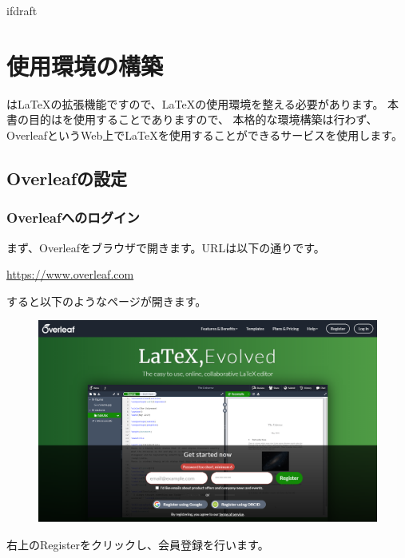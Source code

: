 \expandafter\ifx\csname ifdraft\endcsname\relax
    
	\graphicspath{{./figure/}}
	
\fi

\chapter{\logoLaTeX 使用環境の構築}
	\logoCiTikZ は\LaTeX の拡張機能ですので、\LaTeX の使用環境を整える必要があります。
	本書の目的は\logoCiTikZ を使用することでありますので、
	本格的な環境構築は行わず、OverleafというWeb上で\LaTeX を使用することができるサービスを使用します。

	\section{Overleafの設定}
		\subsection{Overleafへのログイン}
			まず、Overleafをブラウザで開きます。URLは以下の通りです。
			\begin{mdframed}[style=shadow]
				\url{https://www.overleaf.com}
			\end{mdframed}\vspace{-3mm}
			すると以下のようなページが開きます。
			\begin{figure}[H]
				\centering
				\includegraphics[width=\textwidth]{overleaf-page-top.png}
			\end{figure}
			右上のRegisterをクリックし、会員登録を行います。

		\newpage
